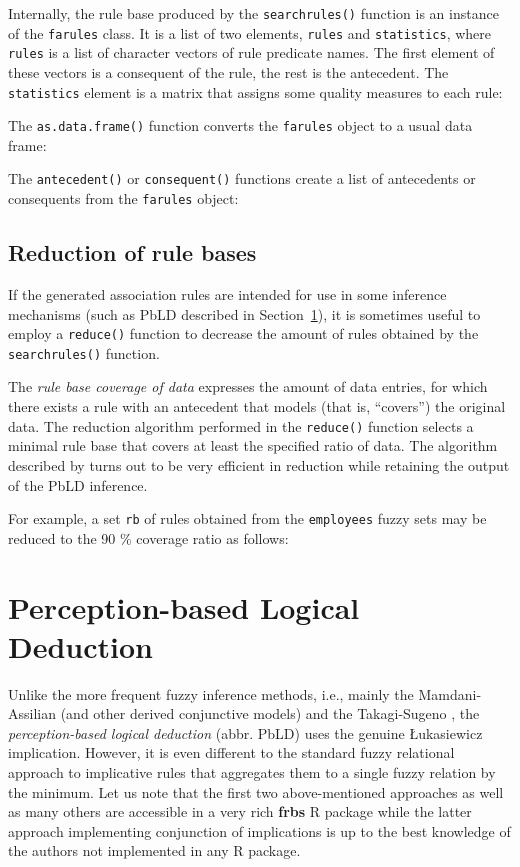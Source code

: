 \documentclass[review]{elsarticle}
\newcommand{\pkg}[1]{\textbf{#1}}
\newcommand{\proglang}[1]{#1}
\newcommand{\code}[1]{\texttt{#1}}
\begin{document}
Internally, the rule base produced by the \code{searchrules()} function is an instance of the \code{farules} class. It is a list of two elements, \code{rules} and \code{statistics}, where \code{rules} is a list of character vectors of rule predicate names. The first element of these vectors is a consequent of the rule, the rest is the antecedent. The \code{statistics} element is a matrix that assigns some quality measures to each rule:
%

%
The \code{as.data.frame()} function converts the \code{farules} object to a usual data frame:
%

%
The \code{antecedent()} or \code{consequent()} functions create a list of antecedents or consequents from the \code{farules} object:
%



\subsection{Reduction of rule bases}

If the generated association rules are intended for use in some inference mechanisms (such as PbLD described in Section~\ref{sec:pbld}), it is sometimes useful to employ a \code{reduce()} function to decrease the amount of rules obtained by the \code{searchrules()} function.

The \emph{rule base coverage of data} expresses the amount of data entries, for which there exists a
rule with an antecedent that models (that is, ``covers'') the original data. The reduction algorithm performed in the \code{reduce()} function selects a minimal rule base that covers at least the specified ratio of data. The algorithm described by \cite{burda2015} turns out to be very efficient in reduction while retaining the output of the PbLD inference.

For example, a set \code{rb} of rules obtained from the \code{employees} fuzzy sets may be reduced to the 90 \% coverage ratio as follows:
%





\section{Perception-based Logical Deduction}
\label{sec:pbld}


Unlike the more frequent fuzzy inference methods, i.e., mainly the Mamdani-Assilian \citep{MamdaniAssilian75} (and other derived conjunctive models) and the Takagi-Sugeno \citep{TakagiSugeno:IEEE85}, the \emph{ perception-based logical deduction} (abbr. PbLD) uses the genuine \L ukasiewicz implication. However, it is even different to the standard fuzzy relational approach to implicative rules \citep{BodenhoferDankovaStepnickaNovak07} that aggregates them to a single fuzzy relation by the minimum. Let us note that the first two above-mentioned approaches as well as many others are accessible in a very rich \pkg{frbs} \proglang{R} package while the latter approach implementing conjunction of implications is up to the best knowledge of the authors not implemented in any \proglang{R} package. 
\end{document}
